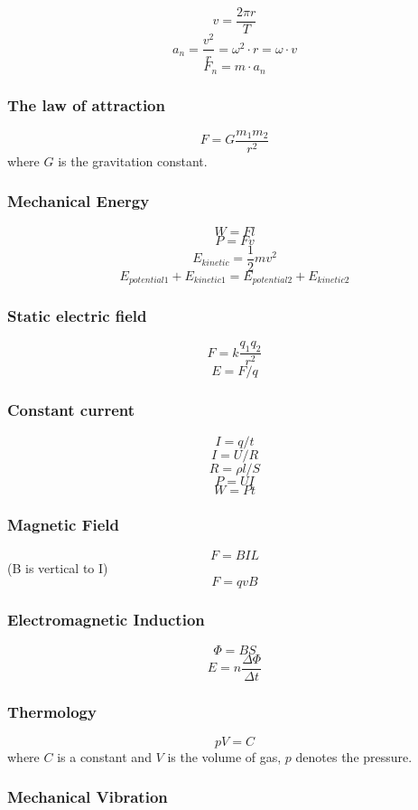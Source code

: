 $$ v = \frac{2\pi r}{T} $$
$$ a_n = \frac{v^2}{r} = \omega^2 \cdot r = \omega \cdot v $$
$$ F_n = m \cdot a_n $$

\subsubsection{The law of attraction}

$$ F = G\frac{m_1 m_2}{r^2} $$
where $G$ is the gravitation constant.

\subsubsection{Mechanical Energy}

$$ W=Fl $$
$$ P=Fv $$
$$ E_{kinetic} = \frac{1}{2}mv^2 $$
$$ E_{potential1} + E_{kinetic1} = E_{potential2}+E_{kinetic2} $$

\subsubsection{Static electric field}

$$ F = k\frac{q_1 q_2}{r^2} $$
$$ E = F/q $$

\subsubsection{Constant current}

$$ I = q/t $$
$$ I = U/R $$
$$ R = \rho l/S $$
$$ P = UI $$
$$ W = Pt $$

\subsubsection{Magnetic Field}

$$ F=BIL $$ (B is vertical to I)
$$ F=qvB $$

\subsubsection{Electromagnetic Induction}

$$ \Phi = BS $$
$$ E = n\frac{\Delta \Phi}{\Delta t} $$

\subsubsection{Thermology}

$$ pV = C $$
where $C$ is a constant and $V$ is the volume of gas,
$p$ denotes the pressure.

\subsubsection{Mechanical Vibration}

